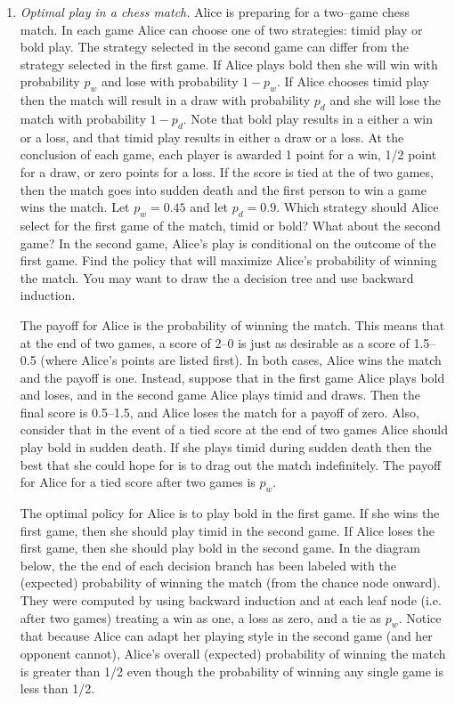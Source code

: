 \begin{enumerate}
\item \emph{Optimal play in a chess match.}  Alice is
  preparing for a two--game chess match.  In each game Alice can
  choose one of two strategies: timid play or bold play. The strategy
  selected in the second game can differ from the strategy selected in
  the first game. If Alice plays bold then she will win with
  probability $p_w$ and lose with probability $1-p_w$. If Alice
  chooses timid play then the match will result in a draw with
  probability $p_d$ and she will lose the match with probability
  $1-p_d$. Note that bold play results in a either a win or a loss,
  and that timid play results in either a draw or a loss. At the
  conclusion of each game, each player is awarded 1 point for a win,
  1/2 point for a draw, or zero points for a loss. If the score is
  tied at the of two games, then the match goes into sudden death and
  the first person to win a game wins the match.  Let $p_w=0.45$ and
  let $p_d=0.9$. Which strategy should Alice select for the first game
  of the match, timid or bold? What about the second game? In the
  second game, Alice's play is conditional on the outcome of the first
  game. Find the policy that will maximize Alice's probability of
  winning the match. You may want to draw the a decision tree and use
  backward induction.

  The payoff for Alice is the probability of winning the match.  This
  means that at the end of two games, a score of 2--0 is just as
  desirable as a score of 1.5--0.5 (where Alice's points are listed
  first).  In both cases, Alice wins the match and the payoff is
  one. Instead, suppose that in the first game Alice plays bold and
  loses, and in the second game Alice plays timid and draws. Then the
  final score is 0.5--1.5, and Alice loses the match for a payoff of
  zero. Also, consider that in the event of a tied score at the end of
  two games Alice should play bold in sudden death. If she plays timid
  during sudden death then the best that she could hope for is to drag
  out the match indefinitely. The payoff for Alice for a tied score
  after two games is $p_w$.

\begin{solution}
  \bs The optimal policy for Alice is to play bold in the first
  game. If she wins the first game, then she should play timid in the
  second game.  If Alice loses the first game, then she should play
  bold in the second game. In the diagram below, the the end of each
  decision branch has been labeled with the (expected) probability of
  winning the match (from the chance node onward). They were computed
  by using backward induction and at each leaf node (i.e. after two
  games) treating a win as one, a loss as zero, and a tie as $p_w$.
  Notice that because Alice can adapt her playing style in the second
  game (and her opponent cannot), Alice's overall (expected)
  probability of winning the match is greater than 1/2 even though the
  probability of winning any single game is less than 1/2.


\end{solution}
\end{enumerate}
